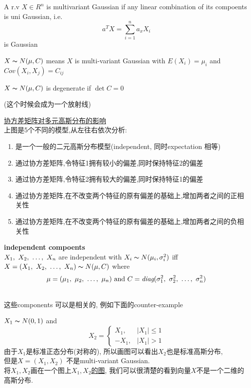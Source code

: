 \documentclass{article}
\begin{document}
\begin{definition}
A r.v $X \in R^n$ is multivariant Gaussian if any linear combination of its compoents is uni Gaussian, i.e.
$$a^T X = \sum_{i=1}^n a_x X_i$$ is Gaussian
\end{definition}

$X \thicksim{N}(\mu, C)$ means $X$ is multi-variant Gaussian with $E(X_i) = \mu_i$ and $Cov(X_i, X_j) = C_{ij}$

\begin{definition}
$X \thicksim{N}(\mu, C)$ is degenerate if $\det{C} = 0$
\end{definition}
(这个时候会成为一个放射线)

\href{http://www.ryanzhang.info/wp-content/uploads/2013/07/QQ\%E6\%88\%AA\%E5\%9B\%BE20130706200349.png}{协方差矩阵对多元高斯分布的影响}\\
上图是5个不同的模型,从左往右依次分析:
\begin{enumerate}
\item 是一个一般的二元高斯分布模型(independent, 同时expectation 相等)
\item 通过协方差矩阵,令特征1拥有较小的偏差,同时保持特征2的偏差
\item 通过协方差矩阵,令特征2拥有较大的偏差,同时保持特征1的偏差
\item 通过协方差矩阵,在不改变两个特征的原有偏差的基础上,增加两者之间的正相关性
\item 通过协方差矩阵,在不改变两个特征的原有偏差的基础上,增加两者之间的负相关性
\end{enumerate}

\begin{theorem}
\textbf{independent compoents}\\
$X_1,~X_2,~\ldots,~X_n$ are independent with $X_i \thicksim{N}(\mu_i, \sigma_i^2)$ iff $X = (X_1,~X_2,~\ldots,~X_n) \thicksim{N}(\mu, C)$ where
$$\mu = (\mu_1,~\mu_2,~\ldots,~\mu_n) \hbox{ and } C = \textit{diag}(\sigma^2_1,~\sigma^2_2,~\ldots,~\sigma^2_n)$$
\label{theorem.gauss.indepent_component}
\end{theorem}

\\
这些components 可以是相关的, 例如下面的counter-example
\begin{example}
$X_1 \thicksim{N}(0,1)$ and
$$
X_2 =
    \left\{
       \begin{array}{ll}
          X_1, & |X_1| \leq 1 \\
          - X_1, & |X_1| > 1
        \end{array}
    \right.
$$
由于$X_1$是标准正态分布(对称的), 所以画图可以看出$X_2$也是标准高斯分布,\\
但是$X=(X_1, X_2)$ 不是multi-variant Gaussian.\\
将$X_1, X_2$画在一个图上\href{http://i.imgbox.com/gmRq7VFK.png}{$X_1, X_2$的图}, 我们可以很清楚的看到向量$X$不是一个二维的高斯分布.
\end{example}
\end{document}
